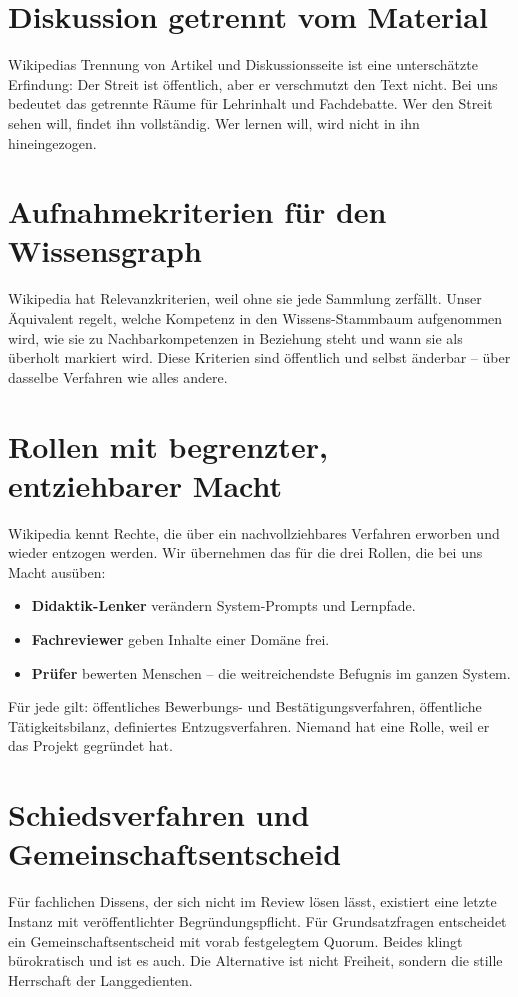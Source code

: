 \documentclass[11pt,a4paper]{article}
\begin{document}
\section{Diskussion getrennt vom Material}
Wikipedias Trennung von Artikel und Diskussionsseite ist eine unterschätzte Erfindung: Der Streit ist öffentlich, aber er verschmutzt den Text nicht. Bei uns bedeutet das getrennte Räume für Lehrinhalt und Fachdebatte. Wer den Streit sehen will, findet ihn vollständig. Wer lernen will, wird nicht in ihn hineingezogen.

\section{Aufnahmekriterien für den Wissensgraph}
Wikipedia hat Relevanzkriterien, weil ohne sie jede Sammlung zerfällt. Unser Äquivalent regelt, welche Kompetenz in den Wissens-Stammbaum aufgenommen wird, wie sie zu Nachbarkompetenzen in Beziehung steht und wann sie als überholt markiert wird. Diese Kriterien sind öffentlich und selbst änderbar -- über dasselbe Verfahren wie alles andere.

\section{Rollen mit begrenzter, entziehbarer Macht}
Wikipedia kennt Rechte, die über ein nachvollziehbares Verfahren erworben und wieder entzogen werden. Wir übernehmen das für die drei Rollen, die bei uns Macht ausüben:
\begin{itemize}[label=--]
    \item \textbf{Didaktik-Lenker} verändern System-Prompts und Lernpfade.
    \item \textbf{Fachreviewer} geben Inhalte einer Domäne frei.
    \item \textbf{Prüfer} bewerten Menschen -- die weitreichendste Befugnis im ganzen System.
\end{itemize}
\noindent Für jede gilt: öffentliches Bewerbungs- und Bestätigungsverfahren, öffentliche Tätigkeitsbilanz, definiertes Entzugsverfahren. Niemand hat eine Rolle, weil er das Projekt gegründet hat.

\section{Schiedsverfahren und Gemeinschaftsentscheid}
Für fachlichen Dissens, der sich nicht im Review lösen lässt, existiert eine letzte Instanz mit veröffentlichter Begründungspflicht. Für Grundsatzfragen entscheidet ein Gemeinschaftsentscheid mit vorab festgelegtem Quorum. Beides klingt bürokratisch und ist es auch. Die Alternative ist nicht Freiheit, sondern die stille Herrschaft der Langgedienten.
\end{document}
